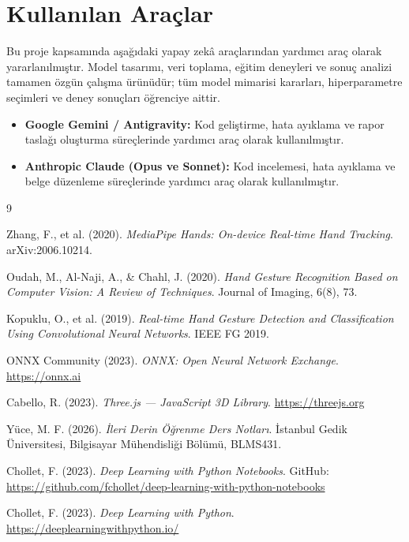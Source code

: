 \documentclass[12pt,a4paper]{article}
\begin{document}
\section*{Kullanılan Araçlar}

Bu proje kapsamında aşağıdaki yapay zekâ araçlarından yardımcı araç olarak yararlanılmıştır. Model tasarımı, veri toplama, eğitim deneyleri ve sonuç analizi tamamen özgün çalışma ürünüdür; tüm model mimarisi kararları, hiperparametre seçimleri ve deney sonuçları öğrenciye aittir.

\begin{itemize}
    \item \textbf{Google Gemini / Antigravity:} Kod geliştirme, hata ayıklama ve rapor taslağı oluşturma süreçlerinde yardımcı araç olarak kullanılmıştır.
    \item \textbf{Anthropic Claude (Opus ve Sonnet):} Kod incelemesi, hata ayıklama ve belge düzenleme süreçlerinde yardımcı araç olarak kullanılmıştır.
\end{itemize}

\begin{thebibliography}{9}

Zhang, F., et al. (2020).
\textit{MediaPipe Hands: On-device Real-time Hand Tracking}.
arXiv:2006.10214.

Oudah, M., Al-Naji, A., \& Chahl, J. (2020).
\textit{Hand Gesture Recognition Based on Computer Vision: A Review of Techniques}.
Journal of Imaging, 6(8), 73.

Kopuklu, O., et al. (2019).
\textit{Real-time Hand Gesture Detection and Classification Using Convolutional Neural Networks}.
IEEE FG 2019.

ONNX Community (2023).
\textit{ONNX: Open Neural Network Exchange}.
\url{https://onnx.ai}

Cabello, R. (2023).
\textit{Three.js — JavaScript 3D Library}.
\url{https://threejs.org}

Yüce, M. F. (2026).
\textit{İleri Derin Öğrenme Ders Notları}.
İstanbul Gedik Üniversitesi, Bilgisayar Mühendisliği Bölümü, BLMS431.

Chollet, F. (2023).
\textit{Deep Learning with Python Notebooks}.
GitHub: \url{https://github.com/fchollet/deep-learning-with-python-notebooks}

Chollet, F. (2023).
\textit{Deep Learning with Python}.
\url{https://deeplearningwithpython.io/}

\end{thebibliography}
\end{document}
